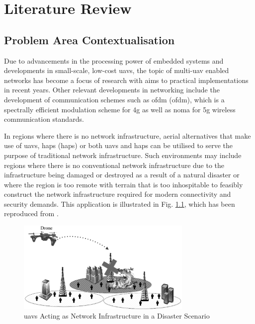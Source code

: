 \chapter{Literature Review}

\section{Problem Area Contextualisation}
Due to advancements in the processing power of embedded systems and developments in small-scale, low-cost \acrshort{uav}s, the topic of multi-\acrshort{uav} enabled networks has become a focus of research with aims to practical implementations in recent years. Other relevant developments in networking include the development of communication schemes such as \acrlong{ofdm} (\acrshort{ofdm}), which is a spectrally efficient modulation scheme for \acrshort{4g} as well as \acrshort{noma} for \acrshort{5g} wireless communication standards. 

In regions where there is no network infrastructure, aerial alternatives that make use of \acrshort{uav}s, \acrlong{hap}s (\acrshort{hap}s) or both \acrshort{uav}s and \acrshort{hap}s can be utilised to serve the purpose of traditional network infrastructure. 
Such environments may include regions where there is no conventional network infrastructure due to the infrastructure being damaged or destroyed as a result of a natural disaster or where the region is too remote with terrain that is too inhospitable to feasibly construct the network infrastructure required for modern connectivity and security demands. This application is illustrated in Fig. \ref{fig:uav_public_safety}, which has been reproduced from \cite{saad_wireless_2020}. 

\begin{figure} [ht!]
    \centering
    \includegraphics[width=0.75\textwidth]{figures/uav_public_safety_scenario.png}
    \caption{\acrshort{uav}s Acting as Network Infrastructure in a Disaster Scenario}
    \label{fig:uav_public_safety}
\end{figure}

